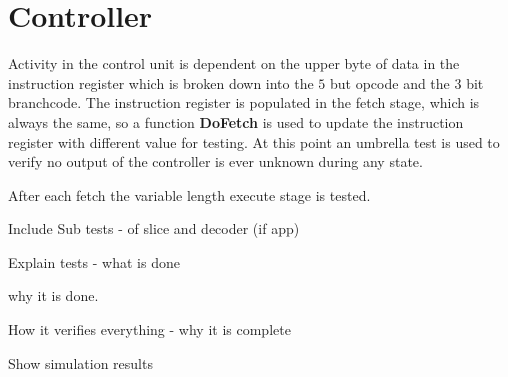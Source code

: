 
\section{Controller}

Activity in the control unit is dependent on the upper byte of data in the instruction register which is broken down into the $5$ but opcode and the $3$ bit branchcode.  
The instruction register is populated in the fetch stage, which is always the same, so a function \textbf{DoFetch} is used to update the instruction register with different value for testing.
At this point an umbrella test is used to verify no output of the controller is ever unknown during any state.

After each fetch the variable length execute stage is tested.





Include Sub tests - of slice and decoder (if app)

Explain tests - what is done

why it is done.

How it verifies everything - why it is complete

Show simulation results

